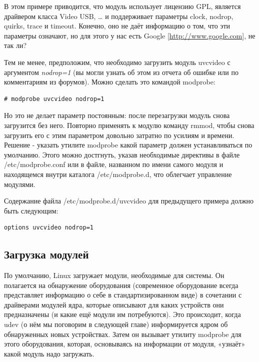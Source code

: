 \documentclass[10pt]{book}
\begin{document}
В этом примере приводится, что модуль использует лицензию GPL, является драйвером класса Video USB, … и поддерживает параметры clock, nodrop, quirks, trace и timeout. Конечно, оно не даёт информацию о том, что эти параметры означают, но для этого у нас есть Google [\url{http://www.google.com}], не так ли?

Тем не менее, предположим, что необходимо загрузить модуль uvcvideo с аргументом \textit{ nodrop=1} (вы могли узнать об этом из отчета об ошибке или по комментариям из форумов). Можно сделать это командой modprobe:

\vspace{3mm}
\begin{tcolorbox}
\begin{lstlisting}
# modprobe uvcvideo nodrop=1
\end{lstlisting}
\end{tcolorbox}

Но это не делает параметр постоянным: после перезагрузки модуль снова загрузится без него. Повторно применять к модулю команду rmmod, чтобы снова загрузить его с этим параметром довольно затратно по усилиям и времени. Решение - указать утилите modprobe какой параметр должен устанавливаться по умолчанию. Этого можно достгнуть, указав необходимые директивы в файле /etc/modprobe.conf или в файле, названном по имени самого модуля и находящемся внутри каталога /etc/modprobe.d, что облегчает управление модулями.

Содержание файла /etc/modprobe.d/uvcvideo для предыдущего примера должно быть следующим:
\vspace{3mm}
\begin{tcolorbox}
\begin{lstlisting}
options uvcvideo nodrop=1
\end{lstlisting}
\end{tcolorbox}

\subsection{Загрузка модулей}

По умолчанию, Linux загружает модули, необходимые для системы.   Он полагается на обнаружение оборудования (современное оборудование всегда представляет информацию о себе в стандартизированном виде) в сочетании с драйверами модулей ядра, которые описывают для каких устройств они предназначены (и какие ещё модули им потребуются). Это происходит, когда udev (о нём мы поговорим в следующей главе) информируется ядром об обнаруженных новых устройствах. Затем он вызывает утилиту modprobe для этого оборудования, которая, основываясь на информации от модуля, «узнаёт» какой модуль надо загружать.
\end{document}
